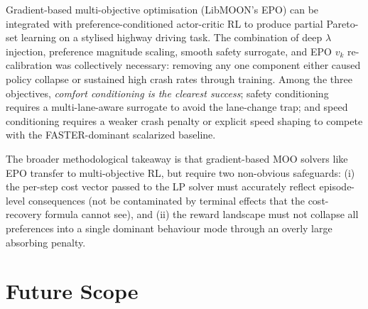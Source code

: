 \documentclass[12pt, letterpaper]{article}
\begin{document}
Gradient-based multi-objective optimisation (LibMOON's EPO) can be integrated with preference-conditioned actor-critic RL to produce partial Pareto-set learning on a stylised highway driving task.
The combination of deep $\lambda$ injection, preference magnitude scaling, smooth safety surrogate, and EPO $v_k$ re-calibration was collectively necessary: removing any one component either caused policy collapse or sustained high crash rates through training.
Among the three objectives, \emph{comfort conditioning is the clearest success}; safety conditioning requires a multi-lane-aware surrogate to avoid the lane-change trap; and speed conditioning requires a weaker crash penalty or explicit speed shaping to compete with the FASTER-dominant scalarized baseline.

The broader methodological takeaway is that gradient-based MOO solvers like EPO transfer to multi-objective RL, but require two non-obvious safeguards: (i) the per-step cost vector passed to the LP solver must accurately reflect episode-level consequences (not be contaminated by terminal effects that the cost-recovery formula cannot see), and (ii) the reward landscape must not collapse all preferences into a single dominant behaviour mode through an overly large absorbing penalty.

\section{Future Scope}
\label{sec:future}
\end{document}
